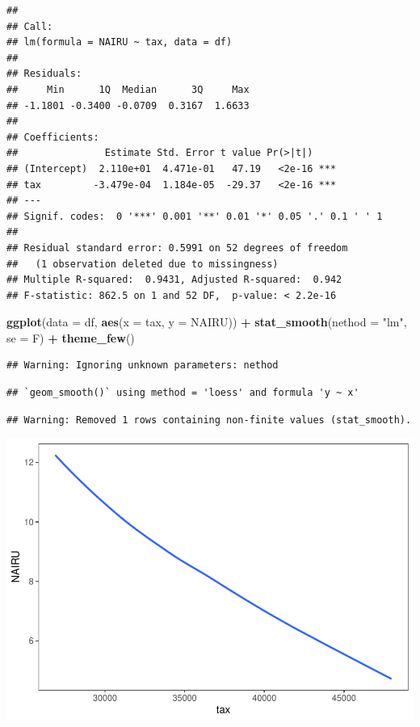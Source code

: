 \documentclass[]{article}
\newenvironment{Shaded}{\begin{snugshade}}{\end{snugshade}}
\newcommand{\DataTypeTok}[1]{\textcolor[rgb]{0.13,0.29,0.53}{#1}}
\newcommand{\KeywordTok}[1]{\textcolor[rgb]{0.13,0.29,0.53}{\textbf{#1}}}
\newcommand{\NormalTok}[1]{#1}
\newcommand{\OperatorTok}[1]{\textcolor[rgb]{0.81,0.36,0.00}{\textbf{#1}}}
\newcommand{\StringTok}[1]{\textcolor[rgb]{0.31,0.60,0.02}{#1}}
\begin{document}
\begin{verbatim}
## 
## Call:
## lm(formula = NAIRU ~ tax, data = df)
## 
## Residuals:
##     Min      1Q  Median      3Q     Max 
## -1.1801 -0.3400 -0.0709  0.3167  1.6633 
## 
## Coefficients:
##               Estimate Std. Error t value Pr(>|t|)    
## (Intercept)  2.110e+01  4.471e-01   47.19   <2e-16 ***
## tax         -3.479e-04  1.184e-05  -29.37   <2e-16 ***
## ---
## Signif. codes:  0 '***' 0.001 '**' 0.01 '*' 0.05 '.' 0.1 ' ' 1
## 
## Residual standard error: 0.5991 on 52 degrees of freedom
##   (1 observation deleted due to missingness)
## Multiple R-squared:  0.9431, Adjusted R-squared:  0.942 
## F-statistic: 862.5 on 1 and 52 DF,  p-value: < 2.2e-16
\end{verbatim}

\begin{Shaded}
\begin{Highlighting}[]
\KeywordTok{ggplot}\NormalTok{(}\DataTypeTok{data =}\NormalTok{ df, }\KeywordTok{aes}\NormalTok{(}\DataTypeTok{x =}\NormalTok{ tax, }\DataTypeTok{y =}\NormalTok{ NAIRU)) }\OperatorTok{+}\StringTok{ }\KeywordTok{stat_smooth}\NormalTok{(}\DataTypeTok{nethod =} \StringTok{"lm"}\NormalTok{, }\DataTypeTok{se =}\NormalTok{ F) }\OperatorTok{+}\StringTok{ }\KeywordTok{theme_few}\NormalTok{()}
\end{Highlighting}
\end{Shaded}

\begin{verbatim}
## Warning: Ignoring unknown parameters: nethod
\end{verbatim}

\begin{verbatim}
## `geom_smooth()` using method = 'loess' and formula 'y ~ x'
\end{verbatim}

\begin{verbatim}
## Warning: Removed 1 rows containing non-finite values (stat_smooth).
\end{verbatim}

\includegraphics{Econo2_P5_files/figure-latex/loading data pme-2.pdf}
\end{document}

